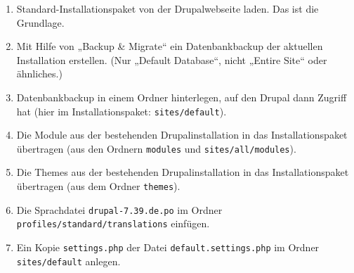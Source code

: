 \documentclass[a4paper,11pt,twoside]{article}
\begin{document}
\begin{enumerate}\itemsep0pt
\item Standard-Installationspaket von der Drupalwebseite laden. Das ist die
  Grundlage.
\item Mit Hilfe von „Backup \& Migrate“ ein Datenbankbackup der aktuellen
  Installation erstellen. (Nur „Default Database“, nicht „Entire Site“ oder
  ähnliches.)
\item Datenbankbackup in einem Ordner hinterlegen, auf den Drupal dann Zugriff
  hat (hier im Installationspaket: \texttt{sites/default}).
\item Die Module aus der bestehenden Drupalinstallation in das
  Installationspaket übertragen (aus den Ordnern \texttt{modules} und
  \texttt{sites/all/modules}).
\item Die Themes aus der bestehenden Drupalinstallation in das
  Installationspaket übertragen (aus dem Ordner \texttt{themes}).
\item Die Sprachdatei \texttt{drupal-7.39.de.po} im Ordner
  \texttt{profiles/standard/translations} einfügen.
\item Ein Kopie \texttt{settings.php} der Datei \texttt{default.settings.php}
  im Ordner \texttt{sites/default} anlegen.
\end{enumerate}
\end{document}
